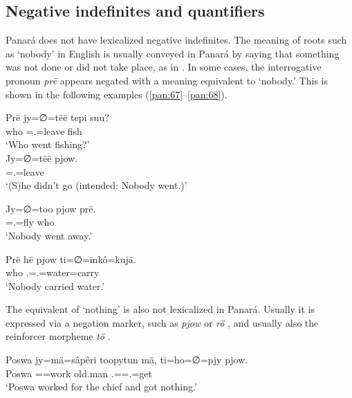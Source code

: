 \documentclass[output=paper,colorlinks,citecolor=brown,draft]{langscibook}
\begin{document}
\subsection{Negative indefinites and quantifiers}\label{pan:sec:indef-quant}

Panará does not have lexicalized negative indefinites. The meaning of roots such as `nobody' in English is usually conveyed in Panará by saying that something was not done or did not take place, as in .
In some cases, the interrogative pronoun \textit{prë} appears negated with a meaning equivalent to `nobody.' This is shown in the following examples (\ref{pan:67}--\ref{pan:68}).

\ea\label{pan:addition}
    \begin{xlist}[Q: ]
       \gll Prë jy=∅=tëë tepi suu?\\
        \Q{} who \Intr{}=\Tsg.\Abs{}=leave fish \\
        \glt `Who went fishing?'  \\
        \gll Jy=∅=tëë pjow.\\
         \Intr{}=\Tsg.\Abs{}=leave \Neg{}  \\
        \glt `(S)he didn't go (intended: Nobody went.)'  \\
    \end{xlist}
\z

\ea\label{pan:67}
    \gll Jy=∅=too pjow prë. \\
    \Intr{}=\Tsg.\Abs{}=fly \Neg{} who\\
    \glt `Nobody went away.' \\
\z
 
\ea\label{pan:68}
    \gll Prë hë pjow ti=∅=inkô=kujä. \\
    who \Erg{} \Neg{} \Tsg.\Erg{}=\Tsg.\Abs{}=water=carry \\
    \glt `Nobody carried water.' \\
\z

The equivalent of `nothing' is also not lexicalized in Panará. Usually it is expressed via a negation marker, such as \textit{pjow} or \textit{rö} , and usually also the reinforcer morpheme \textit{tö} .

\ea\label{pan:69}
    \gll Poswa jy=mä=sâpêri toopytun mä, ti=ho=∅=pjy pjow. \\
    Poswa \Intr{}=\Dat{}=work old.man \Dat{} \Tsg.\Erg{}=\Ins{}=\Tsg.\Abs{}=get \Neg{}  \\
    \glt `Poswa worked for the chief and got nothing.' \\
\z
\end{document}
